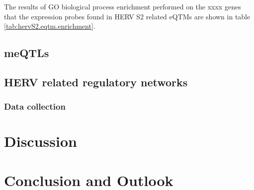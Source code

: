 \documentclass[a4paper,12pt]{article}
\begin{document}
The results of GO biological process enrichment performed on the xxxx genes that the expression probes found in HERV S2 related eQTMs are shown in table \ref{tab:hervS2.eqtm.enrichment}. 


\subsection{meQTLs}

\subsection{HERV related regulatory networks}
\subsubsection{Data collection}


\newpage
\section{Discussion}

\newpage
\section{Conclusion and Outlook}

\newpage
{}

\end{document}
